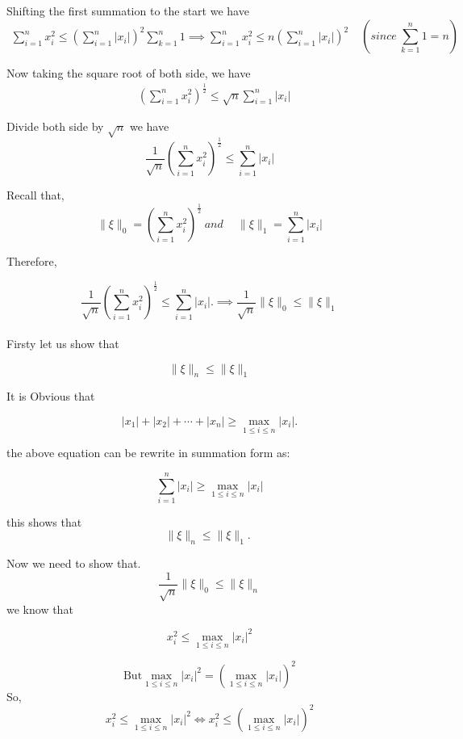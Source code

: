 \documentclass{article}
\begin{document}
Shifting the first summation to the start we have
$$
\begin{gathered}
\sum_{i=1}^{n} x_{i}^{2} \leq\left(\sum_{i=1}^{n}\left|x_{i}\right|\right)^{2} \sum_{k=1}^{n} 1 \implies
\sum_{i=1}^{n} x_{i}^{2} \leq n\left(\sum_{i=1}^{n}\left|x_{i}\right|\right)^{2}  
\end{gathered}~ ~~\left(since ~\sum_{k=1}^{n} 1=n\right)
$$

Now taking the square root of both side, we have
$$
\begin{aligned}
& \left(\sum_{i=1}^{n} x_{i}^{2}\right)^{\frac{1}{2}} \leq \sqrt{n} \sum_{i=1}^{n}\left|x_{i}\right|
\end{aligned}
$$

Divide both side by $\sqrt{n}$ we have
$$ \frac{1}{\sqrt{n}}\left(\sum_{i=1}^{n} x_{i}^{2}\right)^{\frac{1}{2}} \leq \sum_{i=1}^{n}\left|x_{i}\right|
$$

Recall that, $$\|\xi\|_{0}=\left(\sum_{i=1}^{n} x_{i}^{2}\right)^{\frac{1}{2}} ~and ~\quad\|\xi\|_{1}=\sum_{i=1}^{n}\left|x_{i}\right|$$

Therefore,

$$\frac{1}{\sqrt{n}}\left(\sum_{i=1}^{n} x_{i}^{2}\right)^{\frac{1}{2}} \leq \sum_{i=1}^{n}\left|x_{i}\right| .
\implies
\frac{1}{\sqrt{n}}\|\xi\|_{0} \leq\|\xi\|_{1}
$$\\

Firsty let us  show that

$$
\|\xi\|_{n} \leq\|\xi\|_{1}
$$

It is Obvious that

$$
\left|x_{1}\right|+\left|x_{2}\right|+\cdots+\left|x_{n}\right| \geq \max _{1 \leq i \leq n}\left|x_{i}\right| .
$$

the above equation can be rewrite in summation form as:

$$
\sum_{i=1}^{n}\left|x_{i}\right| \geq \max _{1 \leq i \leq n}\left|x_{i}\right|
$$

this shows that
$$
\|\xi\|_{n} \leq\|\xi\|_{1} \text {. }
$$

Now we need to show that.
$$
\frac{1}{\sqrt{n}}\|\xi\|_{0} \leq\|\xi\|_{n}
$$
we know that

$$
x_{i}^{2} \leq \max _{1 \leq i \leq n}\left|x_{i}\right|^{2}
$$

$$ \text{But} \max _{1 \leq i \leq n}\left|x_{i}\right|^{2}=\left(\max _{1 \leq i \leq n}\left|x_{i}\right|\right)^{2}$$
So, $$
x_{i}^{2} \leq \max _{1 \leq i \leq n}\left|x_{i}\right|^{2} \iff x_{i}^{2} \leq\left(\max _{1 \leq i \leq n}\left|x_{i}\right|\right)^{2}
$$
\end{document}
